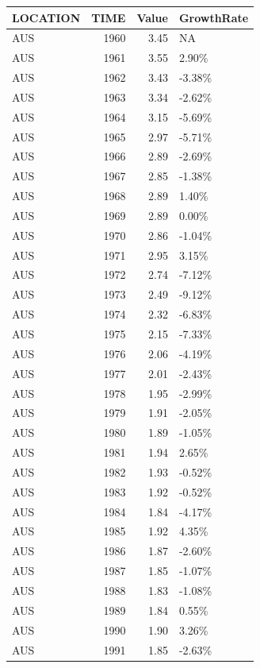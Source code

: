 \documentclass[
]{article}
\begin{document}
\begin{tabular}{l|r|r|l}
\hline
LOCATION & TIME & Value & GrowthRate\\
\hline
AUS & 1960 & 3.45 & NA\\
\hline
AUS & 1961 & 3.55 & 2.90\%\\
\hline
AUS & 1962 & 3.43 & -3.38\%\\
\hline
AUS & 1963 & 3.34 & -2.62\%\\
\hline
AUS & 1964 & 3.15 & -5.69\%\\
\hline
AUS & 1965 & 2.97 & -5.71\%\\
\hline
AUS & 1966 & 2.89 & -2.69\%\\
\hline
AUS & 1967 & 2.85 & -1.38\%\\
\hline
AUS & 1968 & 2.89 & 1.40\%\\
\hline
AUS & 1969 & 2.89 & 0.00\%\\
\hline
AUS & 1970 & 2.86 & -1.04\%\\
\hline
AUS & 1971 & 2.95 & 3.15\%\\
\hline
AUS & 1972 & 2.74 & -7.12\%\\
\hline
AUS & 1973 & 2.49 & -9.12\%\\
\hline
AUS & 1974 & 2.32 & -6.83\%\\
\hline
AUS & 1975 & 2.15 & -7.33\%\\
\hline
AUS & 1976 & 2.06 & -4.19\%\\
\hline
AUS & 1977 & 2.01 & -2.43\%\\
\hline
AUS & 1978 & 1.95 & -2.99\%\\
\hline
AUS & 1979 & 1.91 & -2.05\%\\
\hline
AUS & 1980 & 1.89 & -1.05\%\\
\hline
AUS & 1981 & 1.94 & 2.65\%\\
\hline
AUS & 1982 & 1.93 & -0.52\%\\
\hline
AUS & 1983 & 1.92 & -0.52\%\\
\hline
AUS & 1984 & 1.84 & -4.17\%\\
\hline
AUS & 1985 & 1.92 & 4.35\%\\
\hline
AUS & 1986 & 1.87 & -2.60\%\\
\hline
AUS & 1987 & 1.85 & -1.07\%\\
\hline
AUS & 1988 & 1.83 & -1.08\%\\
\hline
AUS & 1989 & 1.84 & 0.55\%\\
\hline
AUS & 1990 & 1.90 & 3.26\%\\
\hline
AUS & 1991 & 1.85 & -2.63\%\\

\end{tabular}
\end{document}
